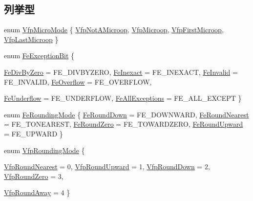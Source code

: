 \subsection*{列挙型}
\begin{DoxyCompactItemize}
\item 
enum \hyperlink{namespaceArmISA_ad386ea556acd7cd538c64e2d73933714}{VfpMicroMode} \{ \hyperlink{namespaceArmISA_ad386ea556acd7cd538c64e2d73933714ae494ecc297ec30cb3eb663bf2e129fd4}{VfpNotAMicroop}, 
\hyperlink{namespaceArmISA_ad386ea556acd7cd538c64e2d73933714a1d11989bfaaca358eec8b719aade8f03}{VfpMicroop}, 
\hyperlink{namespaceArmISA_ad386ea556acd7cd538c64e2d73933714a635f92931cb9ab118b3aeb941b427d03}{VfpFirstMicroop}, 
\hyperlink{namespaceArmISA_ad386ea556acd7cd538c64e2d73933714a1e598d04f975c3ea532f2a74d0107ef8}{VfpLastMicroop}
 \}
\item 
enum \hyperlink{namespaceArmISA_aee44a920445a79afd90562eb0968f8c2}{FeExceptionBit} \{ \par
\hyperlink{namespaceArmISA_aee44a920445a79afd90562eb0968f8c2ab5da21c9fa84d158ea14b5775536e342}{FeDivByZero} =  FE\_\-DIVBYZERO, 
\hyperlink{namespaceArmISA_aee44a920445a79afd90562eb0968f8c2a7431e67cffe90012a842cc72c0f6a15d}{FeInexact} =  FE\_\-INEXACT, 
\hyperlink{namespaceArmISA_aee44a920445a79afd90562eb0968f8c2ac6a2e3ca35f61a44376e7195e3ff4f3f}{FeInvalid} =  FE\_\-INVALID, 
\hyperlink{namespaceArmISA_aee44a920445a79afd90562eb0968f8c2a1da926071fcb5444b7105accc98e92cc}{FeOverflow} =  FE\_\-OVERFLOW, 
\par
\hyperlink{namespaceArmISA_aee44a920445a79afd90562eb0968f8c2a4c138af0ce2d87fd62d1876f3ea44a4e}{FeUnderflow} =  FE\_\-UNDERFLOW, 
\hyperlink{namespaceArmISA_aee44a920445a79afd90562eb0968f8c2a2156374325923a4546af9ef1d2c75829}{FeAllExceptions} =  FE\_\-ALL\_\-EXCEPT
 \}
\item 
enum \hyperlink{namespaceArmISA_a18702087a5c907c59544f0303248f398}{FeRoundingMode} \{ \hyperlink{namespaceArmISA_a18702087a5c907c59544f0303248f398aa75384d1484ab13af574a8b1784263ee}{FeRoundDown} =  FE\_\-DOWNWARD, 
\hyperlink{namespaceArmISA_a18702087a5c907c59544f0303248f398a85159e0d676c99ea1ee7baddb535ea5c}{FeRoundNearest} =  FE\_\-TONEAREST, 
\hyperlink{namespaceArmISA_a18702087a5c907c59544f0303248f398a1df23a17fd44329918e5d8643314efbb}{FeRoundZero} =  FE\_\-TOWARDZERO, 
\hyperlink{namespaceArmISA_a18702087a5c907c59544f0303248f398a125a59b1bfb8c3745e9a303d06825b6b}{FeRoundUpward} =  FE\_\-UPWARD
 \}
\item 
enum \hyperlink{namespaceArmISA_a18dfa032073e1045ee46441e7c1d1dc3}{VfpRoundingMode} \{ \par
\hyperlink{namespaceArmISA_a18dfa032073e1045ee46441e7c1d1dc3a15f5bdd3dacd7d2d8acbd36d05d8ffbe}{VfpRoundNearest} =  0, 
\hyperlink{namespaceArmISA_a18dfa032073e1045ee46441e7c1d1dc3a798e2413746e2ded05b1a5f2af4d8976}{VfpRoundUpward} =  1, 
\hyperlink{namespaceArmISA_a18dfa032073e1045ee46441e7c1d1dc3a07ef6fb80f27688a8f646ea5eaaa9497}{VfpRoundDown} =  2, 
\hyperlink{namespaceArmISA_a18dfa032073e1045ee46441e7c1d1dc3a8fab8bb29c064f88d12505f4e7d5b767}{VfpRoundZero} =  3, 
\par
\hyperlink{namespaceArmISA_a18dfa032073e1045ee46441e7c1d1dc3a3d1a3035d86baf937fb144e48827fd88}{VfpRoundAway} =  4
 \}
\end{DoxyCompactItemize}
